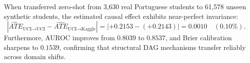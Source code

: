 When transferred zero-shot from 3,630 real Portuguese students to 61,578 unseen synthetic students, the estimated causal effect exhibits near-perfect invariance:
\begin{equation}
    |\widehat{ATE}_{\text{UCI}\to\text{UCI}} - \widehat{ATE}_{\text{UCI}\to\text{Kaggle}}| = |+0.2153 - (+0.2143)| = \mathbf{0.0010 \quad (0.10\%)}.
    \label{eq:causal_invariance_proof}
\end{equation}
Furthermore, AUROC improves from $0.8039$ to $\mathbf{0.8537}$, and Brier calibration sharpens to $\mathbf{0.1539}$, confirming that structural DAG mechanisms transfer reliably across domain shifts.
